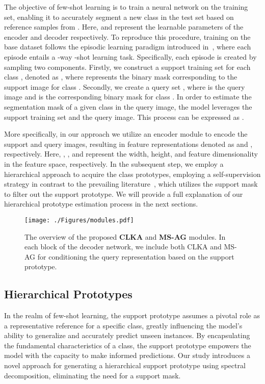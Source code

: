 \documentclass[runningheads]{llncs}
\begin{document}
The objective of few-shot learning is to train a neural network  on the training set, enabling it to accurately segment a new class  in the test set based on  reference samples from . Here,  and  represent the learnable parameters of the encoder and decoder respectively. 
To reproduce this procedure, training on the base dataset  follows the episodic learning paradigm introduced in~\cite{vinyals2016matching}, where each episode entails a -way -shot learning task. Specifically, each episode is created by sampling two components. Firstly, we construct a support training set for each class , denoted as , where  represents the binary mask corresponding to the support image  for class . Secondly, we create a query set , where  is the query image and  is the corresponding binary mask for class . In order to estimate the segmentation mask of a given class  in the query image, the model leverages the support training set and the query image. This process can be expressed as .

More specifically, in our approach we utilize an encoder module to encode the support and query images, resulting in feature representations denoted as  and , respectively. Here, , , and  represent the width, height, and feature dimensionality in the feature space, respectively. 
In the subsequent step, we employ a hierarchical approach to acquire the class prototypes, employing a self-supervision strategy in contrast to the prevailing literature~\cite{azad2021texture,hariharan2015hypercolumns}, which utilizes the support mask  to filter out the support prototype. We will provide a full explanation of our hierarchical prototype estimation process in the next sections.






\begin{figure}[!th]
    \centering
    \texttt{[image: ./Figures/modules.pdf]}
    \caption{The overview of the proposed \textbf{CLKA} and \textbf{MS-AG} modules. In each block of the decoder network, we include both CLKA and MS-AG for conditioning the query representation based on the support prototype.}
    \label{fig:decoder}
\end{figure} 


\subsection{Hierarchical Prototypes}
In the realm of few-shot learning, the support prototype assumes a pivotal role as a representative reference for a specific class, greatly influencing the model's ability to generalize and accurately predict unseen instances. By encapsulating the fundamental characteristics of a class, the support prototype empowers the model with the capacity to make informed predictions. Our study introduces a novel approach for generating a hierarchical support prototype using spectral decomposition, eliminating the need for a support mask.
\end{document}
